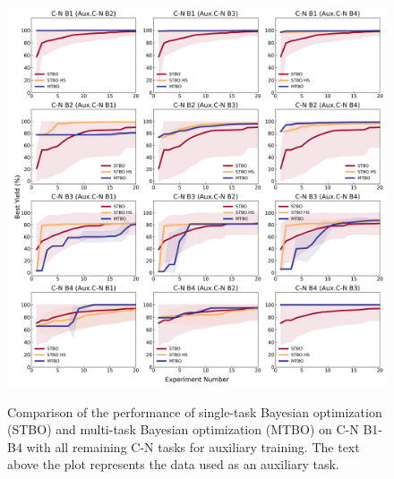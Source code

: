\begin{figure}
\caption{Comparison of the performance of single-task Bayesian optimization (STBO) and multi-task Bayesian optimization (MTBO) on C-N B1-B4 with all remaining C-N tasks for auxiliary training. The text above the plot represents the data used as an auxiliary task.}\includegraphics[width=1\textwidth]{gfx/Appendix/baumgartner_cn_baumgartner_cn_one_cotraining_optimization.png}
\label{fig:14}
\end{figure}


